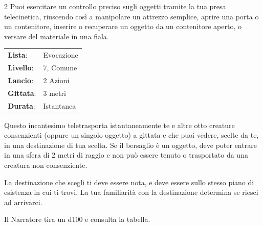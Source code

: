 \begin{multicols}{2}
Puoi esercitare un controllo preciso sugli oggetti tramite la tua presa telecinetica, riuscendo così a manipolare un attrezzo semplice, aprire una porta o un contenitore, inserire o recuperare un oggetto da un contenitore aperto, o versare del materiale in una fiala.

\noindent\begin{tabularx}{\linewidth}{p{1.9cm}X}
	\rowcolor{gray!20}\textbf{Lista}: & Evocazione \\
	\textbf{Livello}: & 7, Comune \\
	\rowcolor{gray!20}\textbf{Lancio}: & 2 Azioni \\
	\textbf{Gittata}: & 3 metri \\
	\rowcolor{gray!20}\textbf{Durata}: & Istantanea \\
\end{tabularx}\smallskip

Questo incantesimo teletrasporta istantaneamente te e altre otto creature consenzienti (oppure un singolo oggetto) a gittata e che puoi vedere, scelte da te, in una destinazione di tua scelta. Se il bersaglio è un oggetto, deve poter entrare in una sfera di 2 metri di raggio e non può essere tenuto o trasportato da una creatura non consenziente.

La destinazione che scegli ti deve essere nota, e deve essere sullo stesso piano di esistenza in cui ti trovi. La tua familiarità con la destinazione determina se riesci ad arrivarci.

Il Narratore tira un d100 e consulta la tabella.


\end{multicols}
